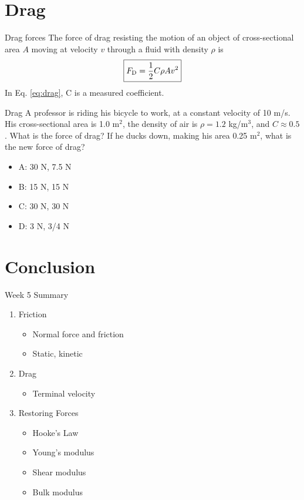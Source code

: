 \documentclass{beamer}
\begin{document}
\section{Drag}

\begin{frame}{Drag forces}
The force of drag resisting the motion of an object of cross-sectional area $A$ moving at velocity $v$ through a fluid with density $\rho$ is \\
\begin{equation}
\boxed{F_{\rm D} = \frac{1}{2}C\rho A v^2}
\label{eq:drag}
\end{equation}
In Eq. \ref{eq:drag}, C is a measured coefficient.
\end{frame}

\begin{frame}{Drag}
A professor is riding his bicycle to work, at a constant velocity of 10 m/s.  His cross-sectional area is 1.0 m$^2$, the density of air is $\rho = 1.2$ kg/m$^3$, and $C \approx 0.5$.  What is the force of drag?  If he ducks down, making his area 0.25 m$^2$, what is the new force of drag?
\begin{itemize}
\item A: 30 N, 7.5 N
\item B: 15 N, 15 N
\item C: 30 N, 30 N
\item D: 3 N, 3/4 N
\end{itemize}
\end{frame}

\section{Conclusion}

\begin{frame}{Week 5 Summary}
\begin{enumerate}
\item \alert{Friction}
\begin{itemize}
\item Normal force and friction
\item Static, kinetic
\end{itemize}
\item \alert{Drag}
\begin{itemize}
\item Terminal velocity
\end{itemize}
\item \alert{Restoring Forces}
\begin{itemize}
\item Hooke's Law
\item Young's modulus
\item Shear modulus
\item Bulk modulus
\end{itemize}
\end{enumerate}
\end{frame}
\end{document}
